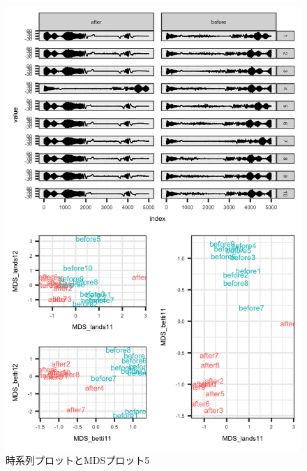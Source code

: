 \documentclass{jarticle}
\begin{document}
\begin{figure}[H]
	\begin{center}
		\includegraphics[width=15cm]{fig/MDS_plot5.png}
		\caption{時系列プロットとMDSプロット5}
		\label{fig:MDS_plot5}
	\end{center}
\end{figure}
\end{document}
